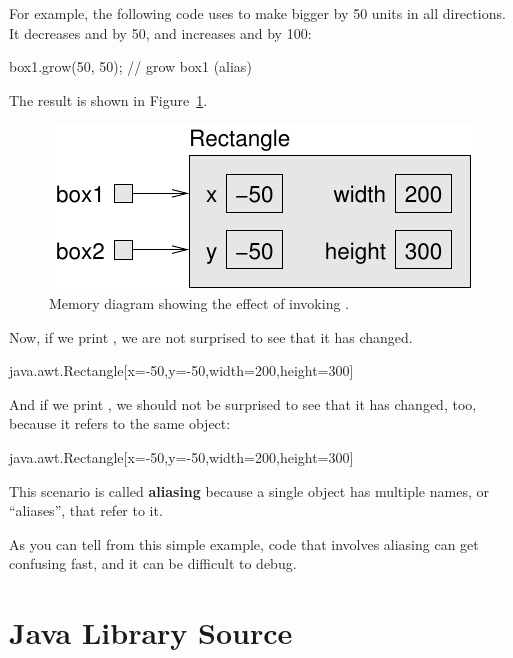 For example, the following code uses  to make  bigger by 50 units in all directions.
It decreases  and  by 50, and increases  and  by 100:

\begin{code}
box1.grow(50, 50);                // grow box1 (alias)
\end{code}

The result is shown in Figure~\ref{fig.aliasing2}.

\begin{figure}[!ht]
\begin{center}
\includegraphics{figs/aliasing2.pdf}
\caption{Memory diagram showing the effect of invoking .}
\label{fig.aliasing2}
\end{center}
\end{figure}

Now, if we print , we are not surprised to see that it has changed.

\begin{code}
java.awt.Rectangle[x=-50,y=-50,width=200,height=300]
\end{code}

And if we print , we should not be surprised to see that it has changed, too, because it refers to the same object:

\begin{code}
java.awt.Rectangle[x=-50,y=-50,width=200,height=300]
\end{code}

This scenario is called {\bf aliasing} because a single object has multiple names, or ``aliases'', that refer to it.

As you can tell from this simple example, code that involves aliasing can get confusing fast, and it can be difficult to debug.


\section{Java Library Source}
\label{src.zip}

